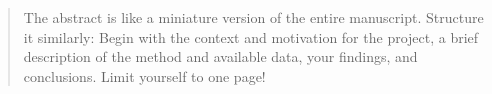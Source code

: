 
\begin{abstract}
\addchaptertocentry{\abstractname} %
The abstract is like a miniature version of the entire manuscript. Structure it similarly: Begin with the context and motivation for the project, a brief description of the method and available data, your findings, and conclusions. Limit yourself to one page!
\end{abstract}
